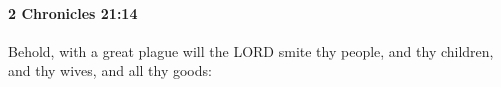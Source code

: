 
		\paragraph{2 Chronicles 21:14} %
			\label{2CHRONICLES-21-14}

			Behold, with a great plague will the LORD smite thy people, and thy children, and thy wives, and all thy goods:


